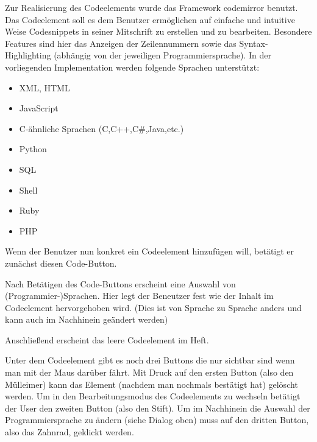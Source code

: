 
Zur Realisierung des Codeelements wurde das Framework codemirror \cite{CODEM} benutzt. Das Codeelement soll es dem Benutzer ermöglichen auf einfache und intuitive Weise Codesnippets in seiner Mitschrift zu erstellen und zu bearbeiten. Besondere Features sind hier das Anzeigen der Zeilennummern sowie das Syntax-Highlighting (abhängig von der jeweiligen Programmiersprache). In der vorliegenden Implementation werden folgende Sprachen unterstützt:
\begin{itemize}
\item XML, HTML
\item JavaScript
\item C-ähnliche Sprachen (C,C++,C\#,Java,etc.)
\item Python
\item SQL
\item Shell
\item Ruby
\item PHP
\end{itemize}

Wenn der Benutzer nun konkret ein Codeelement hinzufügen will, betätigt er zunächst diesen Code-Button.


Nach Betätigen des Code-Buttons erscheint eine Auswahl von (Programmier-)Sprachen. Hier legt der Beneutzer fest wie der Inhalt im Codeelement hervorgehoben wird. (Dies ist von Sprache zu Sprache anders und kann auch im Nachhinein geändert werden)


Anschließend erscheint das leere Codeelement im Heft.


Unter dem Codeelement gibt es noch drei Buttons die nur sichtbar sind wenn man mit der Maus darüber fährt. Mit Druck auf den ersten Button (also den Mülleimer) kann das Element (nachdem man nochmals bestätigt hat) gelöscht werden. Um in den Bearbeitungsmodus des Codeelements zu wechseln betätigt der User den zweiten Button (also den Stift). Um im Nachhinein die Auswahl der Programmiersprache zu ändern (siehe Dialog oben) muss auf den dritten Button, also das Zahnrad, geklickt werden.

